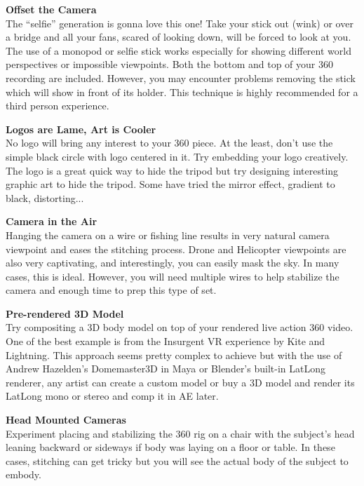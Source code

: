 \begin{fullwidth}

{\bfseries Offset the Camera}
\\
The “selfie” generation is gonna love this one! Take your stick out (wink) or over a bridge and all your fans, scared of looking down, will be forced to look at you. The use of a monopod or selfie stick works especially for showing different world perspectives or impossible viewpoints. Both the bottom and top of your 360 recording are included. However, you may encounter problems removing the stick which will show in front of its holder. This technique is highly recommended for a third person experience.


{\bfseries Logos are Lame, Art is Cooler}
\\
No logo will bring any interest to your 360 piece. At the least, don’t use the simple black circle with logo centered in it. Try embedding your logo creatively. The logo is a great quick way to hide the tripod but try designing interesting graphic art to hide the tripod. Some have tried the mirror effect, gradient to black, distorting... 

\clearpage
{\bfseries Camera in the Air}
\\
Hanging the camera on a wire or fishing line results in very natural camera viewpoint and eases the stitching process. Drone and Helicopter viewpoints are also very captivating, and interestingly, you can easily mask the sky. In many cases, this is ideal. However, you will need multiple wires to help stabilize the camera and enough time to prep this type of set.


{\bfseries Pre-rendered 3D Model}
\\
Try compositing a 3D body model on top of your rendered live action 360 video. One of the best example is from the Insurgent VR experience by Kite and Lightning. This approach seems pretty complex to achieve but with the use of Andrew Hazelden's Domemaster3D in Maya or Blender's built-in LatLong renderer, any artist can create a custom model or buy a 3D model and render its LatLong mono or stereo and comp it in AE later.

\clearpage
{\bfseries Head Mounted Cameras}
\\
Experiment placing and stabilizing the 360 rig on a chair with the subject’s head leaning backward or sideways if body was laying on a floor or table. In these cases, stitching can get tricky but you will see the actual body of the subject to embody.


\end{fullwidth}
